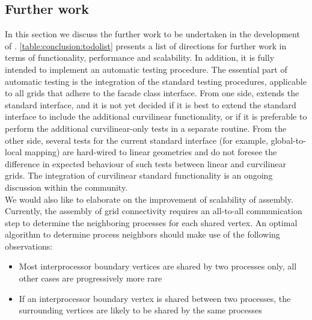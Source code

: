 \subsection{Further work}
\label{sec:conclusion:futurework}

\noindent
In this section we discuss the further work to be undertaken in the development of \curvgrid{}. \cref{table:conclusion:todolist} presents a list of directions for further work in terms of functionality, performance and scalability. In addition, it is fully intended to implement an automatic \curvgrid{} testing procedure. The essential part of automatic testing is the integration of the standard \dunegrid{} testing procedures, applicable to all grids that adhere to the facade class interface. From one side, \curvgrid{} extends the standard \dunegrid{} interface, and it is not yet decided if it is best to extend the standard interface to include the additional curvilinear functionality, or if it is preferable to perform the additional curvilinear-only tests in a separate routine. From the other side, several tests for the current standard interface (for example, global-to-local mapping) are hard-wired to linear geometries and do not foresee the difference in expected behaviour of such tests between linear and curvilinear grids. The integration of curvilinear standard functionality is an ongoing discussion within the \dune{} community. \\

\noindent
We would also like to elaborate on the improvement of scalability of \curvgrid{} assembly. Currently, the assembly of grid connectivity requires an all-to-all communication step to determine the neighboring processes for each shared vertex. An optimal algorithm to determine process neighbors should make use of the following observations:
\begin{itemize}
 \item Most interprocessor boundary vertices are shared by two processes only, all other cases are progressively more rare
 \item If an interprocessor boundary vertex is shared between two processes, the surrounding vertices are likely to be shared by the same processes
\end{itemize}

